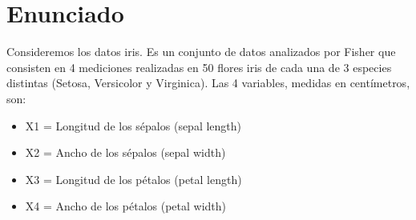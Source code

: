 \documentclass{estilo}
\begin{document}
\maketitle

\section*{Enunciado}
Consideremos los datos iris. Es un conjunto de datos analizados por Fisher que consisten en 4 mediciones realizadas en 50 flores iris de cada una de 3 especies distintas (Setosa, Versicolor y Virginica). Las 4 variables, medidas en centímetros, son:
\begin{itemize}
    \item X1 = Longitud de los sépalos (sepal length)
    \item X2 = Ancho de los sépalos (sepal width)
    \item X3 = Longitud de los pétalos (petal length)
    \item X4 = Ancho de los pétalos (petal width)
\end{itemize}
\end{document}
